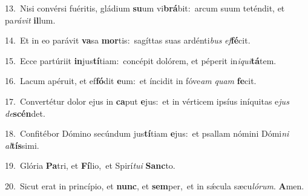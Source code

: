 {\numbfont\textcolor{\numbcolor}{13.}}~Nisi convérsi fuéritis, gládium \textbf{su}\-um vi\-\textbf{brá}\-bit:~\star arcum suum teténdit, et pa\-\textit{rá}\-\textit{vit} \textbf{il}\-lum.\par
{\numbfont\textcolor{\numbcolor}{14.}}~Et in eo parávit \textbf{va}\-sa \textbf{mor}\-tis:~\star sagíttas suas ardénti\textit{bus} \textit{ef}\-\textbf{fé}cit.\par
{\numbfont\textcolor{\numbcolor}{15.}}~Ecce partúriit \textbf{in}\-jus\-\textbf{tí}\-tiam:~\star concépit dolórem, et péperit in\-\textit{i}\-\textit{qui}\textbf{tá}tem.\par
{\numbfont\textcolor{\numbcolor}{16.}}~Lacum apéruit, et ef\-\textbf{fó}\-dit \textbf{e}\-um:~\star et íncidit in fóve\textit{am} \textit{quam} \textbf{fe}\-cit.\par
{\numbfont\textcolor{\numbcolor}{17.}}~Convertétur dolor ejus in \textbf{ca}\-put \textbf{e}\-jus:~\star et in vérticem ipsíus iníquitas e\textit{jus} \textit{de}\-\textbf{scén}det.\par
{\numbfont\textcolor{\numbcolor}{18.}}~Confitébor Dómino secúndum jus\-\textbf{tí}\-tiam \textbf{e}\-jus:~\star et psallam nómini Dómi\textit{ni} \textit{al}\-\textbf{tís}simi.\par
{\numbfont\textcolor{\numbcolor}{19.}}~Glória \textbf{Pa}\-tri, et \textbf{Fí}\-lio,~\star et Spirí\-\textit{tu}\-\textit{i} \textbf{Sanc}\-to.\par
{\numbfont\textcolor{\numbcolor}{20.}}~Sicut erat in princípio, et \textbf{nunc}\-, et \textbf{sem}\-per,~\star et in sǽcula sæcu\-\textit{ló}\-\textit{rum}. \textbf{A}\-men.\par
